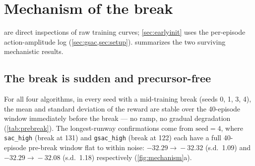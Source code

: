 \section{Mechanism of the break}
\label{sec:mechanism}

 are direct inspections of raw training
curves; \cref{sec:earlyinit} uses the per-episode action-amplitude log
(\cref{sec:gsac,sec:setup}).  summarizes the two
surviving mechanistic results.

\subsection{The break is sudden and precursor-free}
\label{sec:precursor}

For all four algorithms, in every seed with a mid-training break (seeds 0, 1,
3, 4), the mean and standard deviation of the reward are stable over the
40-episode window immediately before the break --- no ramp, no gradual
degradation (\cref{tab:prebreak}). The longest-runway confirmations come from
$\text{seed}=4$, where \texttt{sac\_high} (break at 131) and
\texttt{gsac\_high} (break at 122) each have a full 40-episode pre-break
window flat to within noise: $-32.29\!\to\!-32.32$ (s.d.\ 1.09) and
$-32.29\!\to\!-32.08$ (s.d.\ 1.18) respectively (\cref{fig:mechanism}a).

\begin{table}[t]
\centering
\caption{Pre-break reward statistics (40-episode window where the runway
allows, else the full pre-break run; seed $=0\,/\,1\,/\,4$).}
\label{tab:prebreak}
\small
{}

\end{table}

